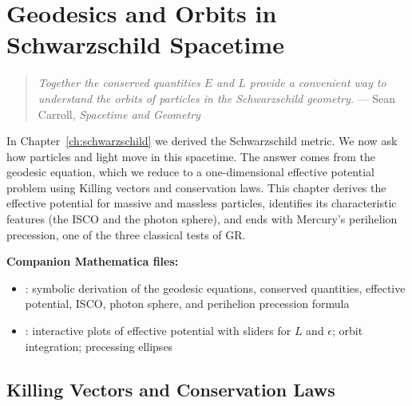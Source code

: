 
\chapter{Geodesics and Orbits in Schwarzschild Spacetime}
\label{ch:geodesics_orbits}

\begin{quote}
\textit{Together the conserved quantities $E$ and $L$ provide a convenient way
to understand the orbits of particles in the Schwarzschild geometry.}
\hfill --- Sean Carroll, \textit{Spacetime and Geometry}
\end{quote}

\noindent
In Chapter~\ref{ch:schwarzschild} we derived the Schwarzschild metric.  We now ask how
particles and light move in this spacetime.  The answer comes from
the geodesic equation, which we reduce to a one-dimensional effective
potential problem using Killing vectors and conservation laws.  This
chapter derives the effective potential for massive and massless particles,
identifies its characteristic features (the ISCO and the photon sphere), and ends with
Mercury's perihelion precession, one of the three classical tests of GR.

\medskip
\noindent
\textbf{Companion Mathematica files:}
\begin{itemize}[nosep]
    \item {}:
          symbolic derivation of the geodesic equations, conserved
          quantities, effective potential, ISCO, photon sphere, and
          perihelion precession formula
    \item {}:
          interactive plots of effective potential with sliders for
          $L$ and $\epsilon$; orbit integration; precessing ellipses
\end{itemize}


\section{Killing Vectors and Conservation Laws}
\label{sec:killing_vectors}

